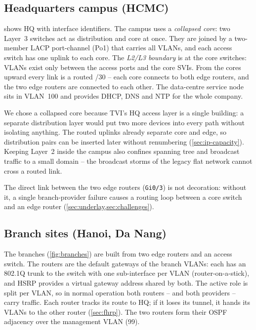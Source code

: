 \subsection{Headquarters campus (HCMC)}\label{sec:arch-hq}
 shows HQ with interface identifiers. The campus uses a \emph{collapsed core}: two
Layer~3 switches act as distribution and core at once. They are joined by a two-member LACP port-channel
(Po1) that carries all VLANs, and each access switch has one uplink to each core. The \emph{L2/L3
boundary} is at the core switches: VLANs exist only between the access ports and the core SVIs. From
the cores upward every link is a routed /30 -- each core connects to both edge routers, and the two edge
routers are connected to each other. The data-centre service node  sits in VLAN~100 and
provides DHCP, DNS and NTP for the whole company.

We chose a collapsed core because TVI's HQ access layer is a single building: a separate distribution
layer would put two more devices into every path without isolating anything. The routed uplinks already
separate core and edge, so distribution pairs can be inserted later without renumbering
(\cref{sec:ip-capacity}). Keeping Layer~2 inside the campus also confines spanning tree and broadcast
traffic to a small domain -- the broadcast storms of the legacy flat network cannot cross a routed link.

The direct link between the two edge routers (\texttt{Gi0/3}) is not decoration: without it, a single
branch-provider failure causes a routing loop between a core switch and an edge router
(\cref{sec:underlay,sec:challenges}).

\begin{landscape}
\end{landscape}

\subsection{Branch sites (Hanoi, Da Nang)}\label{sec:arch-branches}
The branches (\cref{fig:branches}) are built from two edge routers and an access switch. The routers are the
default gateways of the branch VLANs: each has an 802.1Q trunk to the switch with one sub-interface per VLAN
(router-on-a-stick), and HSRP provides a virtual gateway address shared by both. The active role is split
per VLAN, so in normal operation both routers -- and both providers -- carry traffic. Each router tracks
its route to HQ; if it loses its tunnel, it hands its VLANs to the other router (\cref{sec:fhrp}). The two
routers form their OSPF adjacency over the management VLAN (99).

